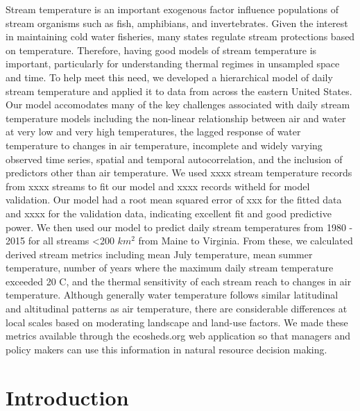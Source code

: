 \documentclass[]{article}
\begin{document}
Stream temperature is an important exogenous factor influence
populations of stream organisms such as fish, amphibians, and
invertebrates. Given the interest in maintaining cold water fisheries,
many states regulate stream protections based on temperature. Therefore,
having good models of stream temperature is important, particularly for
understanding thermal regimes in unsampled space and time. To help meet
this need, we developed a hierarchical model of daily stream temperature
and applied it to data from across the eastern United States. Our model
accomodates many of the key challenges associated with daily stream
temperature models including the non-linear relationship between air and
water at very low and very high temperatures, the lagged response of
water temperature to changes in air temperature, incomplete and widely
varying observed time series, spatial and temporal autocorrelation, and
the inclusion of predictors other than air temperature. We used xxxx
stream temperature records from xxxx streams to fit our model and xxxx
records witheld for model validation. Our model had a root mean squared
error of xxx for the fitted data and xxxx for the validation data,
indicating excellent fit and good predictive power. We then used our
model to predict daily stream temperatures from 1980 - 2015 for all
streams \textless{}200 \(km^2\) from Maine to Virginia. From these, we
calculated derived stream metrics including mean July temperature, mean
summer temperature, number of years where the maximum daily stream
temperature exceeded 20 C, and the thermal sensitivity of each stream
reach to changes in air temperature. Although generally water
temperature follows similar latitudinal and altitudinal patterns as air
temperature, there are considerable differences at local scales based on
moderating landscape and land-use factors. We made these metrics
available through the ecosheds.org web application so that managers and
policy makers can use this information in natural resource decision
making.

\section{Introduction}\label{introduction}
\end{document}
